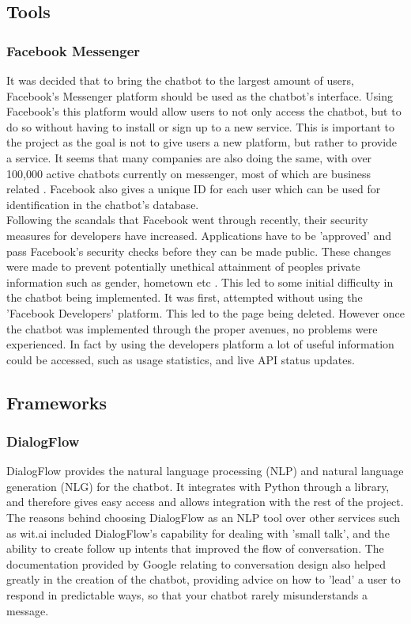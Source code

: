\documentclass[12pt,a4paper]{article}
\begin{document}
    \subsection{Tools}
    \subsubsection*{Facebook Messenger}
    It was decided that to bring the chatbot to the largest amount of users, Facebook's Messenger platform should be used as the chatbot's interface. Using Facebook's this platform would allow users to not only access the chatbot, but to do so without having to install or sign up to a new service. This is important to the project as the goal is not to give users a new platform, but rather to provide a service. It seems that many companies are also doing the same, with over 100,000 active chatbots currently on messenger, most of which are business related \citep{Parr17}. Facebook also gives a unique ID for each user which can be used for identification in the chatbot's database. \\
    
    Following the scandals that Facebook went through recently, their security measures for developers have increased. Applications have to be 'approved' and pass Facebook's security checks before they can be made public. These changes were made to prevent potentially unethical attainment of peoples private information such as gender, hometown etc \citep{Perez18}. This led to some initial difficulty in the chatbot being implemented. It was first, attempted without using the 'Facebook Developers' platform. This led to the page being deleted. However once the chatbot was implemented through the proper avenues, no problems were experienced. In fact by using the developers platform a lot of useful information could be accessed, such as usage statistics, and live API status updates.
    
    \subsection{Frameworks}
    
    \subsubsection*{DialogFlow}
    DialogFlow provides the natural language processing (NLP) and natural language generation (NLG) for the chatbot. It integrates with Python through a library, and therefore gives easy access and allows integration with the rest of the project. The reasons behind choosing DialogFlow as an NLP tool over other services such as wit.ai included DialogFlow's capability for dealing with 'small talk', and the ability to create follow up intents that improved the flow of conversation. The documentation provided by Google relating to conversation design also helped greatly in the creation of the chatbot, providing advice on how to 'lead' a user to respond in predictable ways, so that your chatbot rarely misunderstands a message. \\
    
\end{document}
